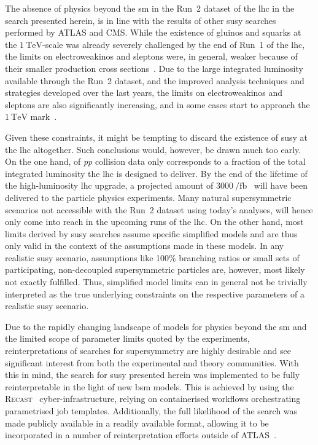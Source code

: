 The absence of physics beyond the \gls{sm} in the Run~2 dataset of the \gls{lhc} in the search presented herein, is in line with the results of other \gls{susy} searches performed by ATLAS and CMS.
While the existence of gluinos and squarks at the $\SI{1}{\TeV}$-scale was already severely challenged by the end of Run~1 of the \gls{lhc}, the limits on electroweakinos and sleptons were, in general, weaker because of their smaller production cross sections~\cite{SUSY-2014-06,SUSY-2014-05}.
Due to the large integrated luminosity available through the Run~2 dataset, and the improved analysis techniques and strategies developed over the last years, the limits on electroweakinos and sleptons are also significantly increasing, and in some cases start to approach the $\SI{1}{\TeV}$ mark~\cite{ATL-PHYS-PUB-2021-007,SUSY-2018-32}. 

Given these constraints, it might be tempting to discard the existence of \gls{susy} at the \gls{lhc} altogether. Such conclusions would, however, be drawn much too early.
On the one hand, \onethirtynineifb of \textit{pp} collision data only corresponds to a fraction of the total integrated luminosity the \gls{lhc} is designed to deliver. By the end of the lifetime of the high-luminosity \gls{lhc} upgrade, a projected amount of $\SI{3000}{\per\femto\barn}$~\cite{Apollinari:2284929} will have been delivered to the particle physics experiments.
Many natural supersymmetric scenarios not accessible with the Run~2 dataset using today's analyses, will hence only come into reach in the upcoming runs of the \gls{lhc}.
On the other hand, most limits derived by \gls{susy} searches assume specific simplified models and are thus only valid in the context of the assumptions made in these models.
In any realistic \gls{susy} scenario, assumptions like 100\% branching ratios or small sets of participating, non-decoupled supersymmetric particles are, however, most likely not exactly fulfilled.
Thus, simplified model limits can in general not be trivially interpreted as the true underlying constraints on the respective parameters of a realistic \gls{susy} scenario.
 
Due to the rapidly changing landscape of models for physics beyond the \gls{sm} and the limited scope of parameter limits quoted by the experiments, reinterpretations of searches for supersymmetry are highly desirable and see significant interest from both the experimental and theory communities.
With this in mind, the search for \gls{susy} presented herein was implemented to be fully reinterpretable in the light of new \gls{bsm} models.
This is achieved by using the \textsc{Recast}~\cite{RECAST_cranmer} cyber-infrastructure, relying on containerised workflows orchestrating parametrised job templates.
Additionally, the full likelihood of the search was made publicly available in a readily available format, allowing it to be incorporated in a number of reinterpretation efforts outside of ATLAS~\cite{SModelS_pyhf:2020grj,Goodsell:2020ddr}. 
 
